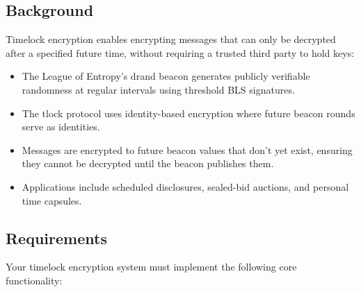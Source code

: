 \documentclass[10pt,a4paper,american]{exam}
\begin{document}
\subsection*{Background}
Timelock encryption enables encrypting messages that can only be decrypted after a specified future time, without requiring a trusted third party to hold keys:
\begin{itemize}
	\item The League of Entropy's drand beacon generates publicly verifiable randomness at regular intervals using threshold BLS signatures.
	\item The tlock protocol uses identity-based encryption where future beacon rounds serve as identities.
	\item Messages are encrypted to future beacon values that don't yet exist, ensuring they cannot be decrypted until the beacon publishes them.
	\item Applications include scheduled disclosures, sealed-bid auctions, and personal time capsules.
\end{itemize}

\subsection*{Requirements}
Your timelock encryption system must implement the following core functionality:
\end{document}
